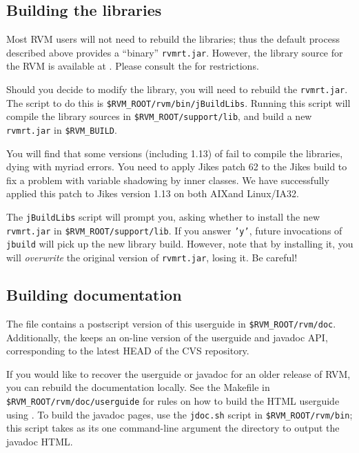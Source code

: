 \JavaTMFooter

\AIXTMFooter

\subsection{Building the libraries}

Most RVM users will not need to rebuild the libraries; thus the default
process described above provides a ``binary'' {\tt rvmrt.jar}.  However,
the library source for the RVM is available at
\xlink{{\tt \RVMDownloadURL}}{\RVMDownloadURL}.  
Please consult the 
 for restrictions.  

Should you decide to modify the library, you will need to rebuild the 
{\tt rvmrt.jar}.  The script to do this is
{\tt \$RVM\_ROOT/rvm/bin/jBuildLibs}.  Running this script will compile the
library sources in {\tt \$RVM\_ROOT/support/lib}, and build a new {\tt
rvmrt.jar} in {\tt \$RVM\_BUILD}.

You will find that some versions (including 1.13) of 
 fail to compile the
libraries, dying with myriad errors.  You need to apply Jikes 
patch 62 to
the Jikes build to fix a problem with variable shadowing by inner classes. 
We have
successfully applied this patch to Jikes version 1.13 on both
AIX\AIXTMFootnote and Linux/IA32.

The {\tt jBuildLibs} script will prompt you, asking whether to install 
the new {\tt rvmrt.jar} in {\tt \$RVM\_ROOT/support/lib}.  
If you answer {\tt 'y'}, future invocations of {\tt jbuild} will pick up
the new library build.  However, note that by installing it, you will
{\em overwrite} the original version of {\tt rvmrt.jar}, losing it.  Be
careful!

\JikesTMFooter

\AIXTMFooter

\subsection{Building documentation}

The {\tt \RVMTarFile} file contains a postscript version of this userguide
in {\tt \$RVM\_ROOT/rvm/doc}.  Additionally, the 
 keeps an on-line version of
the userguide and javadoc API, corresponding to the latest HEAD of the CVS
repository.

If you would like to recover the userguide or javadoc for an older release
of RVM, you can rebuild the documentation locally.  See the Makefile in
{\tt \$RVM\_ROOT/rvm/doc/userguide} for rules on how to build the
HTML userguide using
.  To build the javadoc pages, use
the {\tt jdoc.sh} script in {\tt \$RVM\_ROOT/rvm/bin}; this script takes as
its one command-line argument the directory to output the javadoc HTML.

